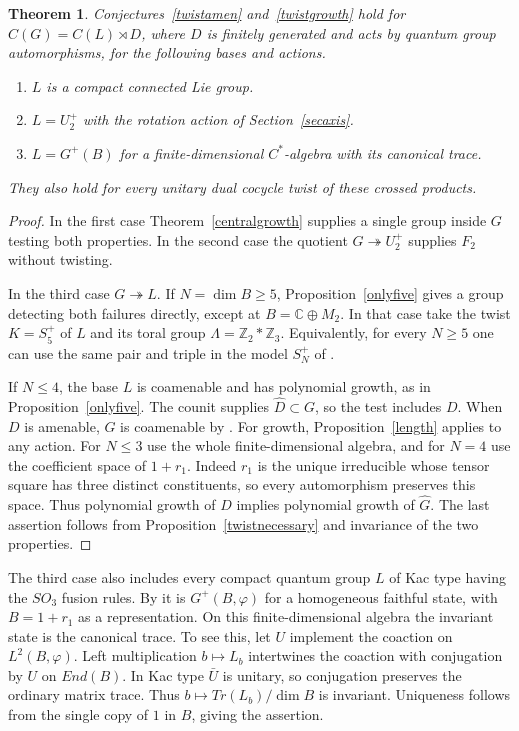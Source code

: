 \documentclass[11pt,a4paper]{article}
\newtheorem{thm}{Theorem}[section]
\theoremstyle{remark}
\begin{document}
\begin{thm}\label{twistclass}
Conjectures~\ref{twistamen} and~\ref{twistgrowth} hold for
$C(G)=C(L)\rtimes D$, where $D$ is finitely generated and acts by
quantum group automorphisms, for the following bases and actions.
\begin{enumerate}
\item $L$ is a compact connected Lie group.
\item $L=U_2^+$ with the rotation action of Section~\ref{secaxis}.
\item $L=G^+(B)$ for a finite-dimensional $C^*$-algebra
with its canonical trace.
\end{enumerate}
They also hold for every unitary dual cocycle twist of these crossed products.
\end{thm}
\begin{proof}
In the first case Theorem~\ref{centralgrowth} supplies a single group
inside $G$ testing both properties. In the second case the quotient
$G\twoheadrightarrow U_2^+$ supplies $F_2$ without twisting.

In the third case $G\twoheadrightarrow L$. If $N=\dim B\ge5$,
Proposition~\ref{onlyfive} gives a group detecting both failures directly,
except at $B=\mathbb C\oplus M_2$. In that case take
the twist $K=S_5^+$ of $L$ and its toral group $\Lambda=\mathbb Z_2*\mathbb Z_3$. Equivalently, for every $N\ge5$ one can use the
same pair and triple in the model $S_N^+$ of \cite[Theorem~3.1]{behy}.

If $N\le4$, the base $L$ is coamenable and has polynomial growth, as in
Proposition~\ref{onlyfive}. The counit supplies $\widehat D\subset G$,
so the test includes $D$. When $D$ is amenable, $G$ is coamenable by
\cite[Corollary~6.4]{fmp}. For growth, Proposition~\ref{length} applies
to any action. For $N\le3$ use the whole finite-dimensional algebra, and
for $N=4$ use the coefficient space of $1+r_1$. Indeed $r_1$ is the
unique irreducible whose tensor square has three distinct constituents,
so every automorphism preserves this space. Thus polynomial growth of
$D$ implies polynomial growth of $\widehat G$. The last assertion follows
from Proposition~\ref{twistnecessary} and invariance of the two properties.
\end{proof}

The third case also includes every compact quantum group $L$ of Kac
type having the $SO_3$ fusion rules. By \cite{mrozinski} it is
$G^+(B,\varphi)$ for a homogeneous faithful state, with
$B=1+r_1$ as a representation. On this finite-dimensional algebra the invariant state is the
canonical trace. To see this, let $U$ implement the coaction on
$L^2(B,\varphi)$. Left multiplication $b\mapsto L_b$ intertwines the
coaction with conjugation by $U$ on $End(B)$. In Kac type
$\bar U$ is unitary, so conjugation preserves the ordinary matrix trace.
Thus $b\mapsto Tr(L_b)/\dim B$ is invariant. Uniqueness follows from the
single copy of $1$ in $B$, giving the assertion.
\end{document}
